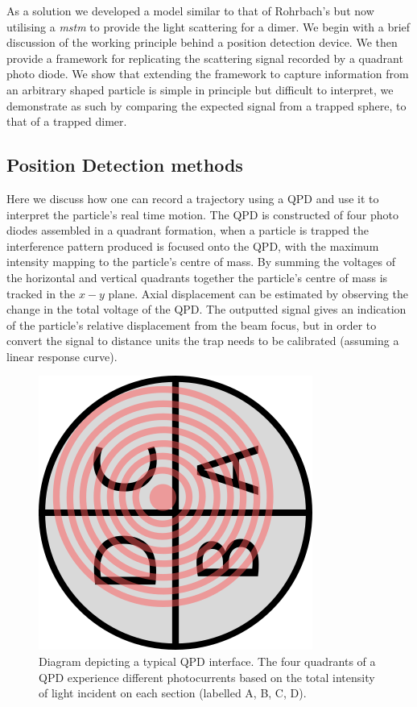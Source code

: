 As a solution we developed a model similar to that of Rohrbach's but 
now utilising a \textit{mstm} to provide the light scattering for a 
dimer. We begin with a brief discussion of the working principle 
behind a position detection device. We then provide a framework for replicating the scattering signal recorded by a quadrant photo diode. 
We show that extending the framework to capture information from an 
arbitrary shaped particle is simple in principle but difficult to 
interpret, we demonstrate as such by comparing the expected signal 
from a trapped sphere, to that of a trapped dimer.

\subsection{Position Detection methods}
Here we discuss how one can record a trajectory using a QPD and 
use it to interpret the particle's real time motion. The QPD is 
constructed of four photo diodes assembled in a quadrant formation, 
when a particle is trapped the interference pattern produced is 
focused onto the QPD, with the maximum intensity mapping to the 
particle's centre of mass. By summing the voltages of the horizontal 
and vertical quadrants together the particle's centre of mass is 
tracked in the $x-y$ plane. Axial displacement can be estimated 
by observing the change in the total voltage of the QPD. The 
outputted signal gives an indication of the particle's relative 
displacement from the beam focus, but in order to convert the 
signal to distance units the trap needs to be calibrated (assuming 
a linear response curve).

\begin{figure}[h!]
	\centering
	\includegraphics[height=0.5\linewidth, angle=270]{QPD_diagram.png}
	\caption{Diagram depicting a typical QPD interface. The four 
		quadrants of a QPD experience different photocurrents based 
		on the total intensity of light incident on each section 
		(labelled A, B, C, D).}
	\label{fig:QPD_diagram}
\end{figure}

